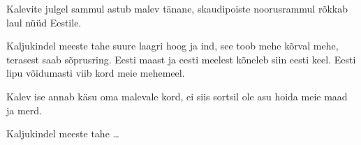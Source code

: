 Kalevite julgel sammul
astub malev t\"anane,
skaudipoiste noorusrammul
r\~okkab laul n\"u\"ud Eestile.

Kaljukindel meeste tahe
suure laagri hoog ja ind,
see toob mehe k\~orval mehe,
terasest saab s\~oprusring.
Eesti maast ja eesti meelest
k\~oneleb siin eesti keel.
Eesti lipu v\~oidumasti
viib kord meie mehemeel.

Kalev ise annab k\"asu
oma malevale kord,
ei siis sortsil ole asu
hoida meie maad ja merd.

Kaljukindel meeste tahe \ldots